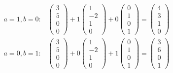 \documentclass[12pt,letterpaper]{exam}
\begin{document}
\begin{questions}
{\[\begin{aligned}
	a=1, b=0 \colon& \begin{pmatrix} 3 \\ 5 \\ 0 \\ 0 \end{pmatrix} + 1 \begin{pmatrix} 1 \\ -2 \\ 1 \\ 0 \end{pmatrix} + 0 \begin{pmatrix} 0 \\ 1 \\ 0 \\ 1 \end{pmatrix}= \begin{pmatrix} 4 \\ 3 \\ 1 \\ 0 \end{pmatrix} \\[0.2cm]
	a=0, b=1 \colon& \begin{pmatrix} 3 \\ 5 \\ 0 \\ 0 \end{pmatrix} + 0 \begin{pmatrix} 1 \\ -2 \\ 1 \\ 0 \end{pmatrix} + 1 \begin{pmatrix} 0 \\ 1 \\ 0 \\ 1 \end{pmatrix}= \begin{pmatrix} 3 \\ 6 \\ 0 \\ 1 \end{pmatrix}
	\end{aligned}
	\]
}

\end{questions}
\end{document}
